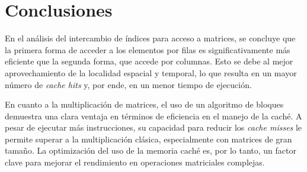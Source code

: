 \documentclass[conference]{IEEEtran}
\begin{document}
    
\section{Conclusiones}

En el análisis del intercambio de índices para acceso a matrices, se concluye que la primera forma de acceder a los elementos por filas es significativamente más eficiente que la segunda forma, que accede por columnas. Esto se debe al mejor aprovechamiento de la localidad espacial y temporal, lo que resulta en un mayor número de \textit{cache hits} y, por ende, en un menor tiempo de ejecución.

En cuanto a la multiplicación de matrices, el uso de un algoritmo de bloques demuestra una clara ventaja en términos de eficiencia en el manejo de la caché. A pesar de ejecutar más instrucciones, su capacidad para reducir los \textit{cache misses} le permite superar a la multiplicación clásica, especialmente con matrices de gran tamaño. La optimización del uso de la memoria caché es, por lo tanto, un factor clave para mejorar el rendimiento en operaciones matriciales complejas.



\end{document}
